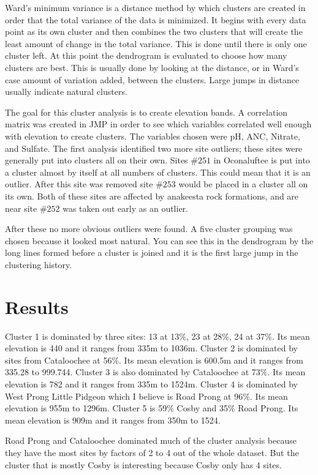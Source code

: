 \documentclass[11pt]{article} %
\begin{document}
Ward’s minimum variance is a distance method by which clusters are created in order that the total variance of the data is minimized.  It begins with every data point as its own cluster and then combines the two clusters that will create the least amount of change in the total variance.  This is done until there is only one cluster left.  At this point the dendrogram is evaluated to choose how many clusters are best.  This is usually done by looking at the distance, or in Ward’s case amount of variation added, between the clusters.  Large jumps in distance usually indicate natural clusters.

The goal for this cluster analysis is to create elevation bands.  A correlation matrix was created in JMP in order to see which variables correlated well enough with elevation to create clusters.  The variables chosen were pH, ANC, Nitrate, and Sulfate.   The first analysis identified two more site outliers; these sites were generally put into clusters all on their own.  Sites $\#251$ in Oconaluftee is put into a cluster almost by itself at all numbers of clusters.  This could mean that it is an outlier.  After this site was removed site $\#253$ would be placed in a cluster all on its own.  Both of these sites are affected by anakeesta rock formations, and are near site $\#252$ was taken out early as an outlier.

After these no more obvious outliers were found.  A five cluster grouping was chosen because it looked most natural.  You can see this in the dendrogram by the long lines formed before a cluster is joined and it is the first large jump in the clustering history.

\section{Results}%
Cluster 1 is dominated by three sites: 13 at 13$\%$, 23 at 28$\%$, 24 at 37$\%$.  Its mean elevation is 440 and it ranges from 335m to 1036m.  Cluster 2 is dominated by sites from Cataloochee at 56$\%$.  Its mean elevation is 600.5m and it ranges from 335.28 to 999.744.  Cluster 3 is also dominated by Cataloochee at 73$\%$. Its mean elevation is 782 and it ranges from 335m to 1524m.  Cluster 4 is dominated by West Prong Little Pidgeon which I believe is Road Prong at 96$\%$.  Its mean elevation is 955m to 1296m.  Cluster 5 is 59$\%$ Cosby and 35$\%$ Road Prong.  Its mean elevation is 909m and it ranges from 350m to 1524.

Road Prong and Cataloochee dominated much of the cluster analysis because they have the most sites by factors of 2 to 4 out of the whole dataset.  But the cluster that is mostly Cosby is interesting because Cosby only has 4 sites. 
\end{document}
